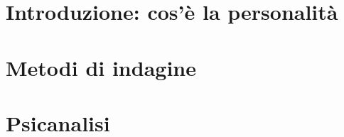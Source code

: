 \documentclass[italian, disablemarginnotes]{../../../Resources/Utils/ClassNotes}
\begin{document}

\section{Introduzione: cos'è la personalità}


\section{Metodi di indagine}


\section{Psicanalisi}

\end{document}
